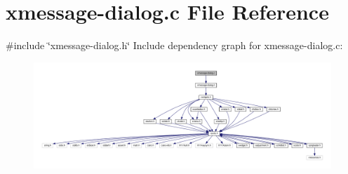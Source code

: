 \hypertarget{xmessage-dialog_8c}{}\section{xmessage-\/dialog.c File Reference}
\label{xmessage-dialog_8c}
{\ttfamily \#include \char`\"{}xmessage-\/dialog.\+h\char`\"{}}\newline
Include dependency graph for xmessage-\/dialog.c\+:
\nopagebreak
\begin{figure}[H]
\begin{center}
\leavevmode
\includegraphics[width=350pt]{xmessage-dialog_8c__incl}
\end{center}
\end{figure}

